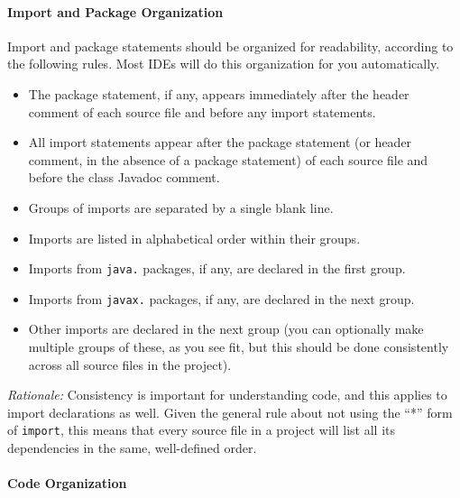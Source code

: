 \paragraph{Import and Package Organization}

Import and package statements should be organized for readability,
according to the following rules. Most IDEs will do this organization
for you automatically.
%
\begin{itemize}
\item The package statement, if any, appears immediately after the
  header comment of each source file and before any import statements.
\item All import statements appear after the package statement (or
  header comment, in the absence of a package statement) of each
  source file and before the class Javadoc comment.
\item Groups of imports are separated by a single blank line.
\item Imports are listed in alphabetical order within their groups.
\item Imports from \texttt{java.} packages, if any, are declared in the first group.
\item Imports from \texttt{javax.} packages, if any, are declared in the next group.
\item Other imports are declared in the next group (you can optionally
  make multiple groups of these, as you see fit, but this should be done consistently across all source files in the project).
\end{itemize}

\emph{Rationale:} Consistency is important for understanding code, and this applies to import declarations as well. Given the general rule about not using the ``*'' form of \texttt{import}, this means that every source file in a project will list all its dependencies in the same, well-defined order.

\paragraph{Code Organization}

